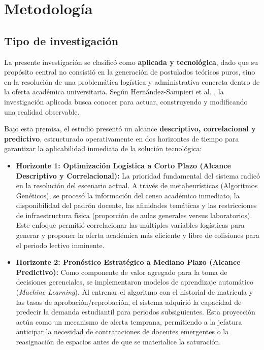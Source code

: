 \chapter[Metodología]{Metodología}
\label{ch:metodologia}

\insertminitoc
\parindent0pt

\section{Tipo de investigación}
La presente investigación se clasificó como \textbf{aplicada y tecnológica}, dado que su propósito central no consistió en la generación de postulados teóricos puros, sino en la resolución de una problemática logística y administrativa concreta dentro de la oferta académica universitaria. Según Hernández-Sampieri et al. \cite{sampieri_metodologia_2014}, la investigación aplicada busca conocer para actuar, construyendo y modificando una realidad observable. 

Bajo esta premisa, el estudio presentó un alcance \textbf{descriptivo, correlacional y predictivo}, estructurado operativamente en dos horizontes de tiempo para garantizar la aplicabilidad inmediata de la solución tecnológica:

\begin{itemize}
    \item \textbf{Horizonte 1: Optimización Logística a Corto Plazo (Alcance Descriptivo y Correlacional):} La prioridad fundamental del sistema radicó en la resolución del escenario actual. A través de metaheurísticas (Algoritmos Genéticos), se procesó la información del censo académico inmediato, la disponibilidad del padrón docente, las afinidades temáticas y las restricciones de infraestructura física (proporción de aulas generales versus laboratorios). Este enfoque permitió correlacionar las múltiples variables logísticas para generar y proponer la oferta académica más eficiente y libre de colisiones para el periodo lectivo inminente.
    \item \textbf{Horizonte 2: Pronóstico Estratégico a Mediano Plazo (Alcance Predictivo):} Como componente de valor agregado para la toma de decisiones gerenciales, se implementaron modelos de aprendizaje automático (\textit{Machine Learning}). Al entrenar el algoritmo con el historial de matrícula y las tasas de aprobación/reprobación, el sistema adquirió la capacidad de predecir la demanda estudiantil para periodos subsiguientes. Esta proyección actúa como un mecanismo de alerta temprana, permitiendo a la jefatura anticipar la necesidad de contrataciones de docentes emergentes o la reasignación de espacios antes de que se materialice la saturación.
\end{itemize}


